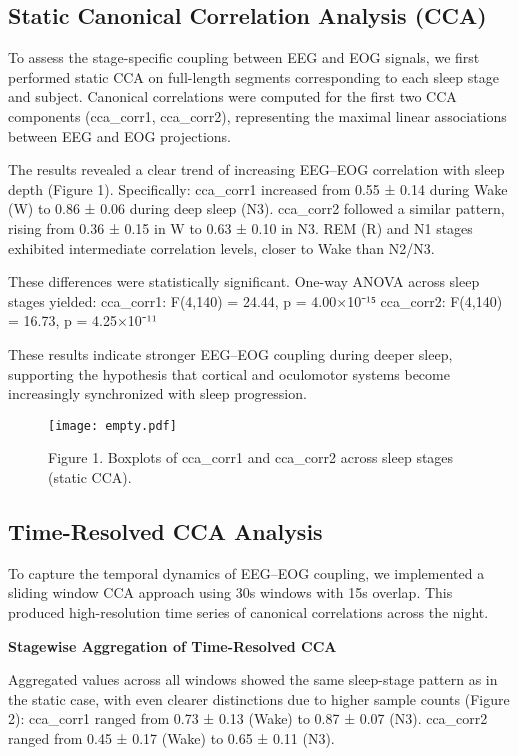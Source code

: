 \subsection{Static Canonical Correlation Analysis (CCA)}

To assess the stage-specific coupling between EEG and EOG signals, we first performed static CCA on full-length segments corresponding to each sleep stage and subject. Canonical correlations were computed for the first two CCA components (cca_corr1, cca_corr2), representing the maximal linear associations between EEG and EOG projections.

The results revealed a clear trend of increasing EEG–EOG correlation with sleep depth (Figure 1). Specifically:
cca_corr1 increased from 0.55 ± 0.14 during Wake (W) to 0.86 ± 0.06 during deep sleep (N3).
cca_corr2 followed a similar pattern, rising from 0.36 ± 0.15 in W to 0.63 ± 0.10 in N3.
REM (R) and N1 stages exhibited intermediate correlation levels, closer to Wake than N2/N3.

These differences were statistically significant. One-way ANOVA across sleep stages yielded:
cca_corr1: F(4,140) = 24.44, p = 4.00×10⁻¹⁵
cca_corr2: F(4,140) = 16.73, p = 4.25×10⁻¹¹

These results indicate stronger EEG–EOG coupling during deeper sleep, supporting the hypothesis that cortical and oculomotor systems become increasingly synchronized with sleep progression.

\begin{figure}
\centering
\texttt{[image: empty.pdf]} %
\caption{Figure 1. Boxplots of cca_corr1 and cca_corr2 across sleep stages (static CCA).}
\end{figure}

\subsection{Time-Resolved CCA Analysis}

To capture the temporal dynamics of EEG–EOG coupling, we implemented a sliding window CCA approach using 30s windows with 15s overlap. This produced high-resolution time series of canonical correlations across the night.

\textbf{Stagewise Aggregation of Time-Resolved CCA}

Aggregated values across all windows showed the same sleep-stage pattern as in the static case, with even clearer distinctions due to higher sample counts (Figure 2):
cca_corr1 ranged from 0.73 ± 0.13 (Wake) to 0.87 ± 0.07 (N3).
cca_corr2 ranged from 0.45 ± 0.17 (Wake) to 0.65 ± 0.11 (N3).

